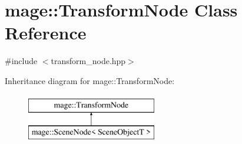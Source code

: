 \hypertarget{classmage_1_1_transform_node}{}\section{mage\+:\+:Transform\+Node Class Reference}
\label{classmage_1_1_transform_node}


{\ttfamily \#include $<$transform\+\_\+node.\+hpp$>$}

Inheritance diagram for mage\+:\+:Transform\+Node\+:\begin{figure}[H]
\begin{center}
\leavevmode
\includegraphics[height=2.000000cm]{classmage_1_1_transform_node}
\end{center}
\end{figure}
